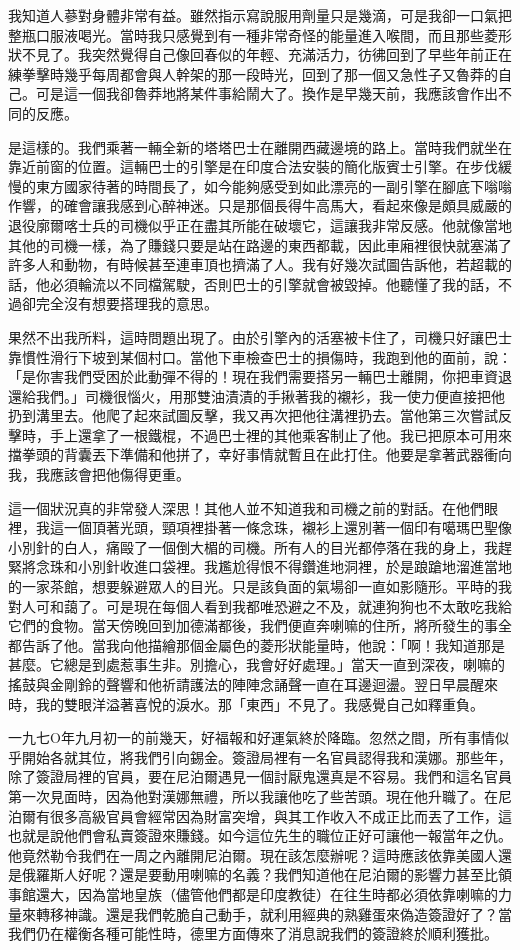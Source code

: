 我知道人蔘對身體非常有益。雖然指示寫說服用劑量只是幾滴，可是我卻一口氣把整瓶口服液喝光。當時我只感覺到有一種非常奇怪的能量進入喉間，而且那些菱形狀不見了。我突然覺得自己像回春似的年輕、充滿活力，彷彿回到了早些年前正在練拳擊時幾乎每周都會與人幹架的那一段時光，回到了那一個又急性子又魯莽的自己。可是這一個我卻魯莽地將某件事給鬧大了。換作是早幾天前，我應該會作出不同的反應。

是這樣的。我們乘著一輛全新的塔塔巴士在離開西藏邊境的路上。當時我們就坐在靠近前窗的位置。這輛巴士的引擎是在印度合法安裝的簡化版賓士引擎。在步伐緩慢的東方國家待著的時間長了，如今能夠感受到如此漂亮的一副引擎在腳底下嗡嗡作響，的確會讓我感到心醉神迷。只是那個長得牛高馬大，看起來像是頗具威嚴的退役廓爾喀士兵的司機似乎正在盡其所能在破壞它，這讓我非常反感。他就像當地其他的司機一樣，為了賺錢只要是站在路邊的東西都載，因此車廂裡很快就塞滿了許多人和動物，有時候甚至連車頂也擠滿了人。我有好幾次試圖告訴他，若超載的話，他必須輪流以不同檔駕駛，否則巴士的引擎就會被毀掉。他聽懂了我的話，不過卻完全沒有想要搭理我的意思。

果然不出我所料，這時問題出現了。由於引擎內的活塞被卡住了，司機只好讓巴士靠慣性滑行下坡到某個村口。當他下車檢查巴士的損傷時，我跑到他的面前，說：「是你害我們受困於此動彈不得的！現在我們需要搭另一輛巴士離開，你把車資退還給我們。」司機很惱火，用那雙油漬漬的手揪著我的襯衫，我一使力便直接把他扔到溝里去。他爬了起來試圖反擊，我又再次把他往溝裡扔去。當他第三次嘗試反擊時，手上還拿了一根鐵棍，不過巴士裡的其他乘客制止了他。我已把原本可用來擋拳頭的背囊丟下準備和他拼了，幸好事情就暫且在此打住。他要是拿著武器衝向我，我應該會把他傷得更重。

這一個狀況真的非常發人深思！其他人並不知道我和司機之前的對話。在他們眼裡，我這一個頂著光頭，頸項裡掛著一條念珠，襯衫上還別著一個印有噶瑪巴聖像小別針的白人，痛毆了一個倒大楣的司機。所有人的目光都停落在我的身上，我趕緊將念珠和小別針收進口袋裡。我尷尬得恨不得鑽進地洞裡，於是踉蹌地溜進當地的一家茶館，想要躲避眾人的目光。只是該負面的氣場卻一直如影隨形。平時的我對人可和藹了。可是現在每個人看到我都唯恐避之不及，就連狗狗也不太敢吃我給它們的食物。當天傍晚回到加德滿都後，我們便直奔喇嘛的住所，將所發生的事全都告訴了他。當我向他描繪那個金屬色的菱形狀能量時，他說：「啊！我知道那是甚麼。它總是到處惹事生非。別擔心，我會好好處理。」當天一直到深夜，喇嘛的搖鼓與金剛鈴的聲響和他祈請護法的陣陣念誦聲一直在耳邊迴盪。翌日早晨醒來時，我的雙眼洋溢著喜悅的淚水。那「東西」不見了。我感覺自己如釋重負。

一九七Ο年九月初一的前幾天，好福報和好運氣終於降臨。忽然之間，所有事情似乎開始各就其位，將我們引向錫金。簽證局裡有一名官員認得我和漢娜。那些年，除了簽證局裡的官員，要在尼泊爾遇見一個討厭鬼還真是不容易。我們和這名官員第一次見面時，因為他對漢娜無禮，所以我讓他吃了些苦頭。現在他升職了。在尼泊爾有很多高級官員會經常因為財富突增，與其工作收入不成正比而丟了工作，這也就是說他們會私賣簽證來賺錢。如今這位先生的職位正好可讓他一報當年之仇。他竟然勒令我們在一周之內離開尼泊爾。現在該怎麼辦呢？這時應該依靠美國人還是俄羅斯人好呢？還是要動用喇嘛的名義？我們知道他在尼泊爾的影響力甚至比領事館還大，因為當地皇族（儘管他們都是印度教徒）在往生時都必須依靠喇嘛的力量來轉移神識。還是我們乾脆自己動手，就利用經典的熟雞蛋來偽造簽證好了？當我們仍在權衡各種可能性時，德里方面傳來了消息說我們的簽證終於順利獲批。

